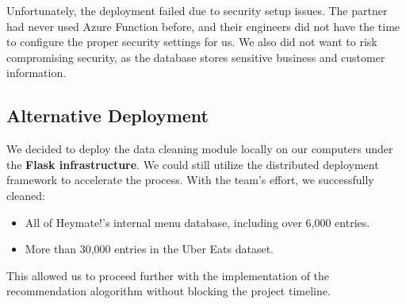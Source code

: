 \documentclass[
  11pt,
  a4paper,
  DIV=11,
  numbers=noendperiod]{scrartcl}
\newenvironment{Shaded}{\begin{snugshade}}{\end{snugshade}}
\newcommand{\AttributeTok}[1]{\textcolor[rgb]{0.40,0.45,0.13}{#1}}
\newcommand{\CharTok}[1]{\textcolor[rgb]{0.13,0.47,0.30}{#1}}
\newcommand{\FunctionTok}[1]{\textcolor[rgb]{0.28,0.35,0.67}{#1}}
\newcommand{\KeywordTok}[1]{\textcolor[rgb]{0.00,0.23,0.31}{\textbf{#1}}}
\newcommand{\StringTok}[1]{\textcolor[rgb]{0.13,0.47,0.30}{#1}}
\providecommand{\tightlist}{%
  \setlength{\itemsep}{0pt}\setlength{\parskip}{0pt}}\usepackage{longtable,booktabs,array}
\begin{document}
\begin{Shaded}
\end{Shaded}

Unfortunately, the deployment failed due to security setup issues. The
partner had never used Azure Function before, and their engineers did
not have the time to configure the proper security settings for us. We
also did not want to risk compromising security, as the database stores
sensitive business and customer information.

\subsection{Alternative Deployment}\label{alternative-deployment}

We decided to deploy the data cleaning module locally on our computers
under the \textbf{Flask infrastructure}. We could still utilize the
distributed deployment framework to accelerate the process. With the
team's effort, we successfully cleaned:

\begin{itemize}
\tightlist
\item
  All of Heymate!'s internal menu database, including over 6,000
  entries.
\item
  More than 30,000 entries in the Uber Eats dataset.
\end{itemize}

This allowed us to proceed further with the implementation of the
recommendation alogorithm without blocking the project timeline.
\end{document}
